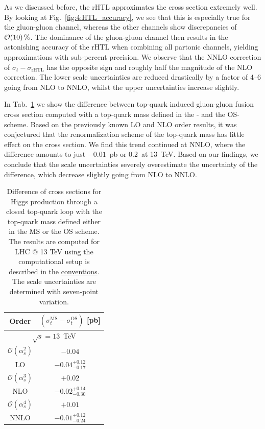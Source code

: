 As we discussed before, the \acs{rHTL} approximates the cross section extremely well. By looking at Fig.~\ref{fig:4:HTL_accuracy}, we see that this is especially true for the gluon-gluon channel, whereas the other channels show discrepancies of $\mathcal{O}\!\left(10\right)\%$. The dominance of the gluon-gluon channel then results in the astonishing accuracy of the \acs{rHTL} when combining all partonic channels, yielding approximations with sub-percent precision. We observe that the \acs{NNLO} correction of $\sigma_t - \sigma_{\text{rHTL}}$ has the opposite sign and roughly half the magnitude of the \acs{NLO} correction. The lower scale uncertainties are reduced drastically by a factor of 4--6 going from \acs{NLO} to \acs{NNLO}, whilst the upper uncertainties increase slightly.

In Tab.~\ref{tab:6:topSchemeDifference} we show the difference between top-quark induced gluon-gluon fusion cross section computed with a top-quark mass defined in the \MS- and the \acs{OS}-scheme. Based on the previously known \acs{LO} and \acs{NLO} order results, it was conjectured that the renormalization scheme of the top-quark mass has little effect on the cross section. We find this trend continued at \acs{NNLO}, where the difference amounts to just $-0.01$~pb or $0.2$\textperthousand\ at 13~TeV. Based on our findings, we conclude that the scale uncertainties severely overestimate the uncertainty of the difference, which decrease slightly going from \acs{NLO} to \acs{NNLO}.
\begin{table}[t]
  \centering
  \begin{tabular}{cc}
  \hline
      Order & $(\sigma_t^{\overline{\mathrm{MS}}} - \sigma_t^{\mathrm{OS}})$ [pb] \\
  \hline
  \hline
  \multicolumn{2}{c}{$\sqrt{s}=13$~TeV} \\
  \hline
  $\mathcal{O}(\alpha_s^2)$     & $-0.04$ \\
  LO & $-0.04^{+0.12}_{-0.17}$ \\
  \hline
  $\mathcal{O}(\alpha_s^3)$ & $+0.02$ \\
  NLO & $-0.02^{+0.14}_{-0.30}$ \\
  \hline
  $\mathcal{O}(\alpha_s^4)$ & $+0.01$ \\
  NNLO & $-0.01^{+0.12}_{-0.24}$ \\
  \hline
  \end{tabular}
\caption{Difference of cross sections for Higgs production through a closed top-quark loop with the top-quark mass defined either in the $\overline{\mathrm{MS}}$ or the OS scheme. The results are computed for LHC @ 13 TeV using the computational setup is described in the \hyperref[chap:notation_and_conventions]{conventions}. The scale uncertainties are determined with seven-point variation.}
\label{tab:6:topSchemeDifference}
\end{table}

